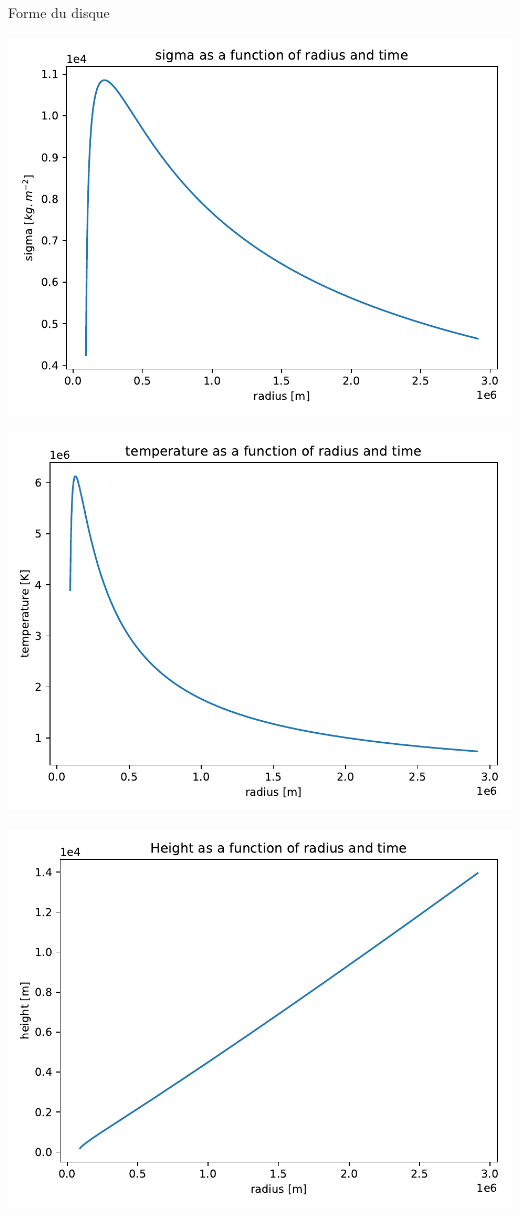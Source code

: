 \documentclass{beamer}
\begin{document}
\begin{frame}{Forme du disque}
	\centering
   \begin{minipage}[c]{.49\linewidth}
      \includegraphics[width = 0.85\linewidth]{ProfileRsigma}
   \end{minipage} \hfill
   \begin{minipage}[c]{.49\linewidth}
      \includegraphics[width = 0.85\linewidth]{ProfileRtemperature}
   \end{minipage}
   \pause
   \includegraphics[width = 0.44\linewidth]{ProfileRheight}
\end{frame}
\end{document}
